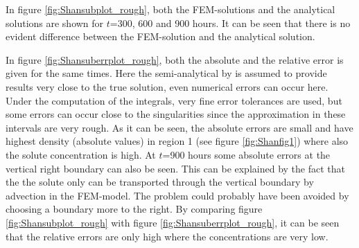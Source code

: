 
In figure \ref{fig:Shansubplot_rough}, both the FEM-solutions and the
analytical solutions are shown for $t$=300, 600 and 900 hours. It can be
seen that there is no evident difference between the FEM-solution and the
analytical solution.


In figure \ref{fig:Shansuberrplot_rough}, both the
absolute and the relative error is given for the same times. Here the
semi-analytical by \cite{Shan} is assumed to provide results very close
to the true solution, even numerical errors can occur
here. Under the computation of the integrals, very fine error
tolerances are used, but some errors can occur close to the singularities
since the approximation in these intervals are very rough. As it can be
seen, the absolute errors are small and have highest density (absolute
values) in region 1 (see figure \ref{fig:Shanfig1}) where also the solute
concentration is high. At $t$=900 hours some absolute errors at
the vertical right boundary can also be seen. This can be explained
by the fact that the the solute only can be transported through the
vertical boundary by advection in the FEM-model. The problem could
probably have been avoided by choosing a boundary more to the
right. By comparing figure \ref{fig:Shansubplot_rough} with figure
\ref{fig:Shansuberrplot_rough}, it can be seen that the relative
errors are only high where the concentrations are very low.



